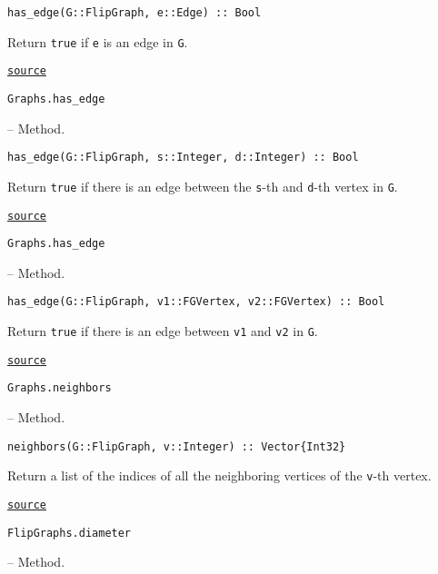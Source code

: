 \begin{adjustwidth}{2em}{0pt}


\begin{verbatim}
has_edge(G::FlipGraph, e::Edge) :: Bool
\end{verbatim}

Return \texttt{true} if \texttt{e} is an edge in \texttt{G}.



\href{https://github.com/schto223/FlipGraphs.jl/blob/e35d43698a06b86273148826b79d585ba04fcd26/src/flipGraph.jl#L184-L188}{\texttt{source}}


\end{adjustwidth}
\hypertarget{8874867711328913772}{\texttt{Graphs.has\_edge}}  -- {Method.}

\begin{adjustwidth}{2em}{0pt}


\begin{verbatim}
has_edge(G::FlipGraph, s::Integer, d::Integer) :: Bool
\end{verbatim}

Return \texttt{true} if there is an edge between the \texttt{s}-th and \texttt{d}-th vertex in \texttt{G}.



\href{https://github.com/schto223/FlipGraphs.jl/blob/e35d43698a06b86273148826b79d585ba04fcd26/src/flipGraph.jl#L191-L195}{\texttt{source}}


\end{adjustwidth}
\hypertarget{14525428844387179697}{\texttt{Graphs.has\_edge}}  -- {Method.}

\begin{adjustwidth}{2em}{0pt}


\begin{verbatim}
has_edge(G::FlipGraph, v1::FGVertex, v2::FGVertex) :: Bool
\end{verbatim}

Return \texttt{true} if there is an edge between \texttt{v1} and \texttt{v2} in \texttt{G}.



\href{https://github.com/schto223/FlipGraphs.jl/blob/e35d43698a06b86273148826b79d585ba04fcd26/src/flipGraph.jl#L198-L202}{\texttt{source}}


\end{adjustwidth}
\hypertarget{10601523073478244094}{\texttt{Graphs.neighbors}}  -- {Method.}

\begin{adjustwidth}{2em}{0pt}


\begin{verbatim}
neighbors(G::FlipGraph, v::Integer) :: Vector{Int32}
\end{verbatim}

Return a list of the indices of all the neighboring vertices of the \texttt{v}-th vertex.



\href{https://github.com/schto223/FlipGraphs.jl/blob/e35d43698a06b86273148826b79d585ba04fcd26/src/flipGraph.jl#L212-L216}{\texttt{source}}


\end{adjustwidth}
\hypertarget{18322570677264282309}{\texttt{FlipGraphs.diameter}}  -- {Method.}


